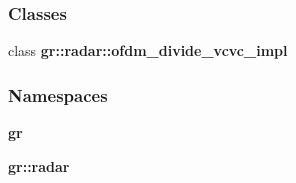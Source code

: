 \subsubsection*{Classes}
\begin{DoxyCompactItemize}
\item 
class {\bf gr\+::radar\+::ofdm\+\_\+divide\+\_\+vcvc\+\_\+impl}
\end{DoxyCompactItemize}
\subsubsection*{Namespaces}
\begin{DoxyCompactItemize}
\item 
 {\bf gr}
\item 
 {\bf gr\+::radar}
\end{DoxyCompactItemize}
